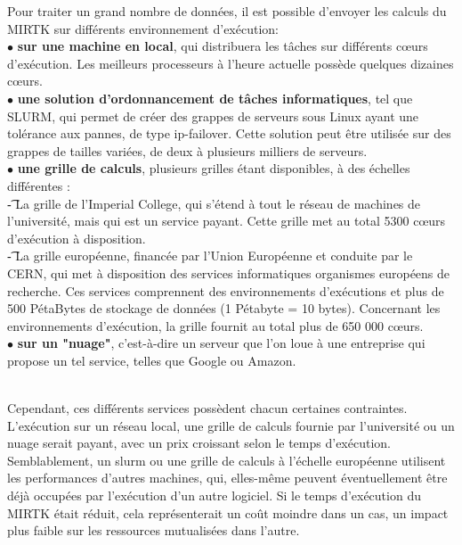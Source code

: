 \documentclass[10pt]{report}
\begin{document}
	Pour traiter un grand nombre de données, il est possible d'envoyer les calculs du MIRTK sur différents environnement d'exécution: %
	\\{$\bullet$}\textbf{ sur une machine en local}, %
	qui distribuera les tâches sur différents cœurs d'exécution. Les meilleurs processeurs à l'heure actuelle possède quelques dizaines cœurs.  
	\\{$\bullet$}\textbf{ une solution d'ordonnancement de tâches informatiques}, tel que SLURM, qui permet de créer des grappes de serveurs sous Linux ayant une tolérance aux pannes, de type ip-failover. Cette solution peut être utilisée sur des grappes de tailles variées, de deux à plusieurs milliers de serveurs.
	\\{$\bullet$}\textbf{ une grille de calculs}, plusieurs grilles étant disponibles, à des échelles différentes : \\%
	\t - La grille de l'Imperial College, qui s'étend à tout le réseau de machines de l'université, mais qui est un service payant. Cette grille met au total 5300 cœurs d'exécution à disposition.\\
	\t - La grille européenne, financée par l'Union Européenne et conduite par le CERN, qui met à disposition des services informatiques organismes européens de recherche. Ces services comprennent des environnements d'exécutions et plus de 500 PétaBytes de stockage de données (1 Pétabyte = 10 bytes). Concernant les environnements d'exécution, la grille fournit au total plus de 650 000 cœurs.
	\\{$\bullet$}\textbf{ sur un "nuage"}, c'est-à-dire un serveur que l'on loue à une entreprise qui propose un tel service, telles que Google ou Amazon.\\ ~\par
	Cependant, ces différents services possèdent chacun certaines contraintes. L'exécution sur un réseau local, une grille de calculs fournie par l'université ou un nuage serait payant, avec un prix croissant selon le temps d'exécution. Semblablement, un slurm ou une grille de calculs à l'échelle européenne utilisent les performances d'autres machines, qui, elles-même peuvent éventuellement être déjà occupées par l'exécution d'un autre logiciel. Si le temps d'exécution du MIRTK était réduit, cela représenterait un coût moindre dans un cas, un impact plus faible sur les ressources mutualisées dans l'autre.\\ ~\par
\end{document}

